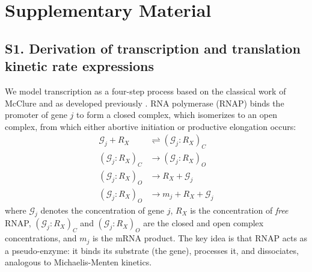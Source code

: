 \section*{Supplementary Material}

\subsection*{S1. Derivation of transcription and translation kinetic rate expressions}

We model transcription as a four-step process based on the classical work of McClure \cite{mcclure_1980} and as developed previously \cite{adhikari2020effective}. RNA polymerase (RNAP) binds the promoter of gene $j$ to form a closed complex, which isomerizes to an open complex, from which either abortive initiation or productive elongation occurs:
\begin{align}
\mathcal{G}_j + R_X &\rightleftharpoons (\mathcal{G}_j : R_X)_C \label{eq:step1} \\
(\mathcal{G}_j : R_X)_C &\rightarrow (\mathcal{G}_j : R_X)_O \label{eq:step2} \\
(\mathcal{G}_j : R_X)_O &\rightarrow R_X + \mathcal{G}_j \label{eq:step3} \\
(\mathcal{G}_j : R_X)_O &\rightarrow m_j + R_X + \mathcal{G}_j \label{eq:step4}
\end{align}
where $\mathcal{G}_j$ denotes the concentration of gene $j$, $R_X$ is the concentration of \textit{free} RNAP, $(\mathcal{G}_j : R_X)_C$ and $(\mathcal{G}_j : R_X)_O$ are the closed and open complex concentrations, and $m_j$ is the mRNA product. The key idea is that RNAP acts as a pseudo-enzyme: it binds its substrate (the gene), processes it, and dissociates, analogous to Michaelis-Menten kinetics.

